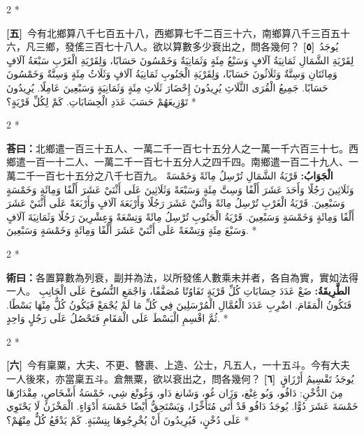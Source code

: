 \documentclass[11pt,a4paper]{article}
\newcommand{\ar}[1]{\arabicfont\beginR #1\endR}
\newcommand{\problemnum}[1]{\textbf{[\ignorespaces#1\unskip]}}
\newenvironment{bilingual}{%
  \begin{paracol}{2}%
  \switchcolumn[0]*%
}{%
  \end{paracol}%
}
\newcommand{\cnline}[1]{\switchcolumn[0]\noindent #1 \switchcolumn[1]}
\newcommand{\arline}[1]{\noindent\ar{#1} \switchcolumn[0]*}
\newenvironment{prob bilingual}{%
  \begin{paracol}{2}%
  \switchcolumn[0]*%
}{%
  \end{paracol}%
  \vspace{0.3em}%
}
\begin{document}
\begin{bilingual}
\cnline{\problemnum{五}\, 今有北鄉算八千七百五十八，西鄉算七千二百三十六，南鄉算八千三百五十六，凡三鄉，發傜三百七十八人。欲以算數多少衰出之，問各幾何？}
\arline{\problemnum{٥}\, يُوجَدُ لِقَرْيَةِ الشَّمَالِ ثَمَانِيَةُ آلَافٍ وَسَبْعُ مِئَةٍ وَثَمَانِيَةٌ وَخَمْسُونَ حَسَابًا، وَلِقَرْيَةِ الْغَرْبِ سَبْعَةُ آلَافٍ وَمِائَتَانِ وَسِتَّةٌ وَثَلَاثُونَ حَسَابًا، وَلِقَرْيَةِ الْجَنُوبِ ثَمَانِيَةُ آلَافٍ وَثَلَاثُ مِئَةٍ وَسِتَّةٌ وَخَمْسُونَ حَسَابًا. جَمِيعُ الْقُرَى الثَّلَاثِ يُرِيدُونَ إِحْضَارَ ثَلَاثِ مِئَةٍ وَثَمَانِيَةٍ وَسَبْعِينَ عَامِلًا. يُرِيدُونَ تَوْزِيعَهُمْ حَسَبَ عَدَدِ الْحِسَابَاتِ. كَمْ لِكُلِّ قَرْيَةٍ؟}
\end{bilingual}

\begin{bilingual}
\cnline{\textcolor{answercolor}{\textbf{荅曰：}}北鄉遣一百三十五人、一萬二千一百七十五分人之一萬一千六百三十七。西鄉遣一百一十二人、一萬二千一百七十五分人之四千四。南鄉遣一百二十九人、一萬二千一百七十五分之八千七百九。}
\arline{\textcolor{answercolor}{\textbf{الْجَوَابُ:}} قَرْيَةُ الشَّمَالِ تُرْسِلُ مِائَةً وَخَمْسَةً وَثَلَاثِينَ رَجُلًا وَأَحَدَ عَشَرَ أَلْفًا وَسِتَّ مِئَةٍ وَسَبْعَةً وَثَلَاثِينَ عَلَى أَثْنَيْ عَشَرَ أَلْفًا وَمِائَةٍ وَخَمْسَةٍ وَسَبْعِينَ. قَرْيَةُ الْغَرْبِ تُرْسِلُ مِائَةً وَاثْنَيْ عَشَرَ رَجُلًا وَأَرْبَعَةَ آلَافٍ وَأَرْبَعَةً عَلَى أَثْنَيْ عَشَرَ أَلْفًا وَمِائَةٍ وَخَمْسَةٍ وَسَبْعِينَ. قَرْيَةُ الْجَنُوبِ تُرْسِلُ مِائَةً وَتِسْعَةً وَعِشْرِينَ رَجُلًا وَثَمَانِيَةَ آلَافٍ وَسَبْعَ مِئَةٍ وَتِسْعَةً عَلَى أَثْنَيْ عَشَرَ أَلْفًا وَمِائَةٍ وَخَمْسَةٍ وَسَبْعِينَ.}
\end{bilingual}

\begin{bilingual}
\cnline{%
\textcolor{methodcolor}{\textbf{術曰：}}各置算數為列衰，副并為法，以所發傜人數乘未并者，各自為實，實如法得一人。
}
\arline{%
\textcolor{methodcolor}{\textbf{الطَّرِيقَةُ:}} ضَعْ عَدَدَ حِسَابَاتِ كُلِّ قَرْيَةٍ تَفَاوُتًا مُصَفَّفًا، وَاجْمَعِ النُّسُوخَ عَلَى الْجَانِبِ فَتَكُونُ الْمَقَامَ. اضْرِبِ عَدَدَ الْعُمَّالِ الْمُرْسَلِينَ فِي كُلِّ مَا لَمْ يُجْمَعْ فَيَكُونُ كُلٌّ مِنْهَا بَسْطًا. ثُمَّ اقْسِمِ الْبَسْطَ عَلَى الْمَقَامِ فَتَحْصُلُ عَلَى رَجُلٍ وَاحِدٍ.
}
\end{bilingual}

\begin{bilingual}
\cnline{\problemnum{六}\, 今有稟粟，大夫、不更、簪裹、上造、公士，凡五人，一十五斗。今有大夫一人後來，亦當稟五斗。倉無粟，欲以衰出之，問各幾何？}
\arline{\problemnum{٦}\, يُوجَدُ تَقْسِيمُ أَرْزَاقٍ مِنَ الدُّخْنِ: دَافُو، وَبُو غِنْغ، وَزَان غُو، وَشَانغ دَاو، وَغُونْغ شِي، خَمْسَةُ أَشْخَاصٍ، مِقْدَارُهَا خَمْسَةَ عَشَرَ دُوًّا. يُوجَدُ دَافُو قَدْ أَتَى مُتَأَخِّرًا، وَيَسْتَحِقُّ أَيْضًا خَمْسَةَ أَدْوَاءٍ. الْمَخْزَنُ لَا يَحْتَوِي عَلَى دُخْنٍ، فَيُرِيدُونَ أَنْ يُخْرِجُوهَا بِنِسْبَةٍ. كَمْ يَدْفَعُ كُلٌّ مِنْهُمْ؟}
\end{bilingual}
\end{document}
